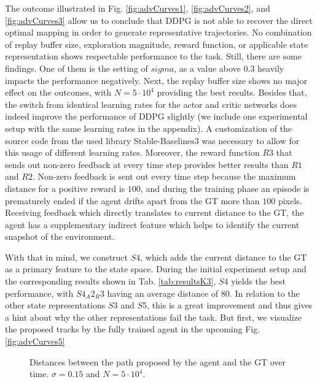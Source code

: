 The outcome illustrated in Fig. \ref{fig:advCurves1}, \ref{fig:advCurves2}, and \ref{fig:advCurves3} allow us to conclude that DDPG is not able to recover the direct optimal mapping in order to generate representative trajectories. No combination of replay buffer size, exploration magnitude, reward function, or applicable state representation shows respectable performance to the task. Still, there are some findings. One of them is the setting of $sigma$, as a value above $0.3$ heavily impacts the performance negatively. Next, the replay buffer size shows no major effect on the outcomes, with $N=5 \cdot 10^4$ providing the best results. Besides that, the switch from identical learning rates for the actor and critic networks does indeed improve the performance of DDPG slightly (we include one experimental setup with the same learning rates in the appendix). A customization of the source code from the used library Stable-Baselines3 was necessary to allow for this usage of different learning rates. Moreover, the reward function $R3$ that sends out non-zero feedback at every time step provides better results than $R1$ and $R2$. Non-zero feedback is sent out every time step because the maximum distance for a positive reward is $100$, and during the training phase an episode is prematurely ended if the agent drifts apart from the GT more than $100$ pixels. Receiving feedback which directly translates to current distance to the GT, the agent has a supplementary indirect feature which helps to identify the current snapshot of the environment.
\par
With that in mind, we construct $S4$, which adds the current distance to the GT as a primary feature to the state space. During the initial experiment setup and the corresponding results shown in Tab. \ref{tab:resultsK3}, $S4$ yields the best performance, with $S4_A2_R3$ having an average distance of $80$. In relation to the other state representations $S3$ and $S5$, this is a great improvement and thus gives a hint about why the other representations fail the task. But first, we visualize the proposed tracks by the fully trained agent in the upcoming Fig. \ref{fig:advCurves5}

\begin{figure}[H]
     \centering
         
        \caption{Distances between the path proposed by the agent and the GT over time. $\sigma = 0.15$ and $N=5\cdot 10^4$.}
        \label{fig:advCurves4}
\end{figure}


